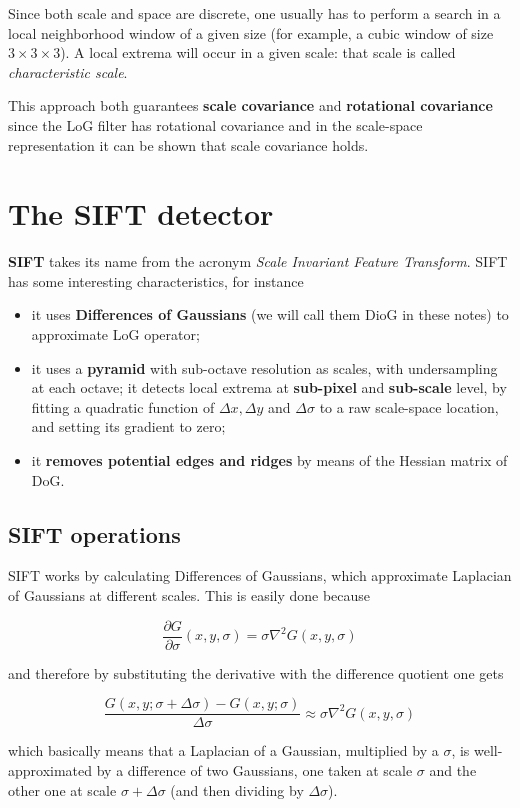\documentclass[10pt]{report}
\begin{document}
Since both scale and space are discrete, one usually has to perform a
search in a local neighborhood window of a given size (for example, a
cubic window of size \(3 \times 3 \times 3\)). A local extrema will
occur in a given scale: that scale is called \emph{characteristic scale}.

This approach both guarantees \textbf{scale covariance} and \textbf{rotational
covariance} since the LoG filter has rotational covariance and in the
scale-space representation it can be shown that scale covariance holds.

\section{The SIFT detector}
\label{the-sift-detector}
\textbf{SIFT} takes its name from the acronym \emph{Scale Invariant Feature
Transform}. SIFT has some interesting characteristics, for instance

\begin{itemize}
\item it uses \textbf{Differences of Gaussians} (we will call them DioG in these
notes) to approximate LoG operator;
\item it uses a \textbf{pyramid} with sub-octave resolution as scales, with
undersampling at each octave; it detects local extrema at \textbf{sub-pixel}
and \textbf{sub-scale} level, by fitting a quadratic function of
\(\Delta x, \Delta y\) and \(\Delta \sigma\) to a raw scale-space
location, and setting its gradient to zero;
\item it \textbf{removes potential edges and ridges} by means of the Hessian matrix of DoG.
\end{itemize}

\subsection{SIFT operations}
\label{sift-operations}
SIFT works by calculating Differences of Gaussians, which approximate
Laplacian of Gaussians at different scales. This is easily done because

\[\frac{\partial G}{\partial \sigma}(x, y, \sigma) = \sigma \nabla^2 G(x, y, \sigma)\]

and therefore by substituting the derivative with the difference
quotient one gets

\[\frac{G(x, y; \sigma + \Delta \sigma) - G(x, y; \sigma)}{\Delta \sigma} \approx \sigma \nabla^2 G(x, y, \sigma)\]

which basically means that a Laplacian of a Gaussian, multiplied by a
\(\sigma\), is well-approximated by a difference of two Gaussians, one
taken at scale \(\sigma\) and the other one at scale
\(\sigma + \Delta \sigma\) (and then dividing by \(\Delta \sigma\)).
\end{document}
